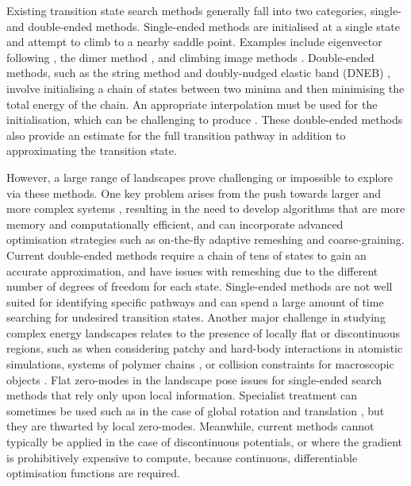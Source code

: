 \documentclass[twocolumn,10pt]{revtex4}
\begin{document}
Existing transition state search methods generally fall into two categories, single- and double-ended methods.
Single-ended methods are initialised at a single state and attempt to climb to a nearby saddle point.
Examples include eigenvector following \cite{Cerjan1981}, the dimer method \cite{Heyden2005,Kastner2008,Zhang2016}, and climbing image methods \cite{E2007,Ren2013}.
Double-ended methods, such as the string method \cite{E2002,E2007} and doubly-nudged elastic band (DNEB) \cite{Trygubenko2004}, involve initialising a chain of states between two minima and then minimising the total energy of the chain.
An appropriate interpolation must be used for the initialisation, which can be challenging to produce \cite{Wales2012a}.
These double-ended methods also provide an estimate for the full transition pathway in addition to approximating the transition state.

However, a large range of landscapes prove challenging or impossible to explore via these methods.
One key problem arises from the push towards larger and more complex systems \cite{Trefethen2013,Shalf2020,Alexander2020}, resulting in the need to develop algorithms that are more memory and computationally efficient, and can incorporate advanced optimisation strategies such as on-the-fly adaptive remeshing and coarse-graining.
Current double-ended methods require a chain of tens of states to gain an accurate approximation, and have issues with remeshing due to the different number of degrees of freedom for each state.
Single-ended methods are not well suited for identifying specific pathways and can spend a large amount of time searching for undesired transition states.
Another major challenge in studying complex energy landscapes relates to the presence of locally flat or discontinuous regions, such as when considering patchy \cite{McMullen2018,Nguemaha2018,Chen2018b} and hard-body \cite{Richard2018,Santra2018} interactions in atomistic simulations, systems of polymer chains \cite{Mokkonen2016}, or collision constraints for macroscopic objects \cite{Wriggers2006}.
Flat zero-modes in the landscape pose issues for single-ended search methods that rely only upon local information.
Specialist treatment can sometimes be used such as in the case of global rotation and translation \cite{Page1988}, but they are thwarted by local zero-modes.
Meanwhile, current methods cannot typically be applied in the case of discontinuous potentials, or where the gradient is prohibitively expensive to compute, because continuous, differentiable optimisation functions are required.
\end{document}
